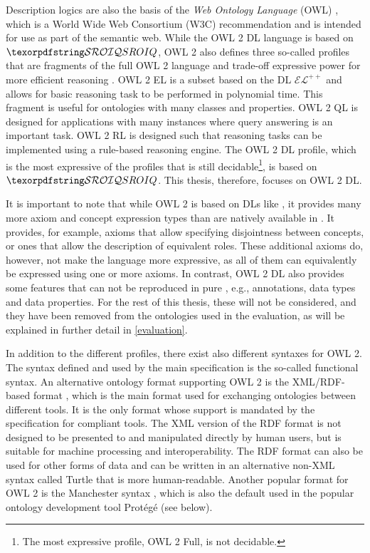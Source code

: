 
Description logics are also the basis of the \emph{Web Ontology Language} (OWL) \cite{hitzler2012primer,motik2012ontology}, which is a World Wide Web Consortium (W3C) recommendation and is intended for use as part of the semantic web. While the OWL 2 DL language is based on $\SROIQ$, OWL 2 also defines three so-called profiles that are fragments of the full OWL 2 language and trade-off expressive power for more efficient reasoning \cite{motik2012profiles,motik2012ontology}. OWL 2 EL is a subset based on the DL $\mathcal{EL}^{++}$ and allows for basic reasoning task to be performed in polynomial time. This fragment is useful for ontologies with many classes and properties. OWL 2 QL is designed for applications with many instances where query answering is an important task. OWL 2 RL is designed such that reasoning tasks can be implemented using a rule-based reasoning engine. The OWL 2 DL profile, which is the most expressive of the profiles that is still decidable\footnote{The most expressive profile, OWL 2 Full, is not decidable.}, is based on $\SROIQ$. This thesis, therefore, focuses on OWL 2 DL.

It is important to note that while OWL 2 is based on DLs like \SROIQ, it provides many more axiom and concept expression types than are natively available in \SROIQ. It provides, for example, axioms that allow specifying disjointness between concepts, or ones that allow the description of equivalent roles. These additional axioms do, however, not make the language more expressive, as all of them can equivalently be expressed using one or more \SROIQ axioms. In contrast, OWL 2 DL also provides some features that can not be reproduced in pure \SROIQ, e.g., annotations, data types and data properties. For the rest of this thesis, these will not be considered, and they have been removed from the ontologies used in the evaluation, as will be explained in further detail in \cref{evaluation}.

In addition to the different profiles, there exist also different syntaxes for OWL 2. The syntax defined and used by the main specification \cite{motik2012ontology} is the so-called functional syntax. An alternative ontology format supporting OWL 2 is the XML/RDF-based format \cite{beckett2004rdf,motik2009rdf}, which is the main format used for exchanging ontologies between different tools. It is the only format whose support is mandated by the specification for compliant tools. The XML version of the RDF format is not designed to be presented to and manipulated directly by human users, but is suitable for machine processing and interoperability. The RDF format can also be used for other forms of data and can be written in an alternative non-XML syntax called Turtle \cite{beckett2008turtle} that is more human-readable. Another popular format for OWL 2 is the Manchester syntax \cite{horridge2009manchester}, which is also the default used in the popular ontology development tool Protégé (see below).

